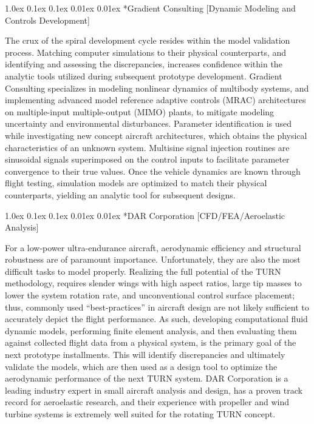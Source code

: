 \documentclass[11pt]{article}
\makeatletter
\renewcommand\subsection{
\@startsection{subsection}{2}{\z@}%
{1.0ex \@plus 0.1ex \@minus 0.1ex}%
{0.01ex \@plus 0.01ex}%
{\normalfont\Large\bfseries}}
\makeatother
\begin{document}
\subsection*{Gradient Consulting [Dynamic Modeling and Controls Development]}

The crux of the spiral development cycle resides within the model validation process.  Matching computer simulations to their physical counterparts, and identifying and assessing the discrepancies, increases confidence within the analytic tools utilized during subsequent prototype development.  Gradient Consulting specializes in modeling nonlinear dynamics of multibody systems, and implementing advanced model reference adaptive controls (MRAC) architectures on multiple-input multiple-output (MIMO) plants, to mitigate modeling uncertainty and environmental disturbances.  Parameter identification is used while investigating new concept aircraft architectures, which obtains the physical characteristics of an unknown system.  Multisine signal injection routines are sinusoidal signals superimposed on the control inputs to facilitate parameter convergence to their true values.  Once the vehicle dynamics are known through flight testing, simulation models are optimized to match their physical counterparts, yielding an analytic tool for subsequent designs.




\subsection*{DAR Corporation [CFD/FEA/Aeroelastic Analysis]}

For a low-power ultra-endurance aircraft, aerodynamic efficiency and structural robustness are of paramount importance.  Unfortunately, they are also the most difficult tasks to model properly.  Realizing the full potential of the TURN methodology, requires slender wings with high aspect ratios, large tip masses to lower the system rotation rate, and unconventional control surface placement; thus, commonly used ``best-practices'' in aircraft design are not likely sufficient to accurately depict the flight performance.  As such, developing computational fluid dynamic models, performing finite element analysis, and then evaluating them against collected flight data from a physical system, is the primary goal of the next prototype installments.  This will identify discrepancies and ultimately validate the models, which are then used as a design tool to optimize the aerodynamic performance of the next TURN system.  DAR Corporation is a leading industry expert in small aircraft analysis and design, has a proven track record for aeroelastic research, and their experience with propeller and wind turbine systems is extremely well suited for the rotating TURN concept.
\end{document}

